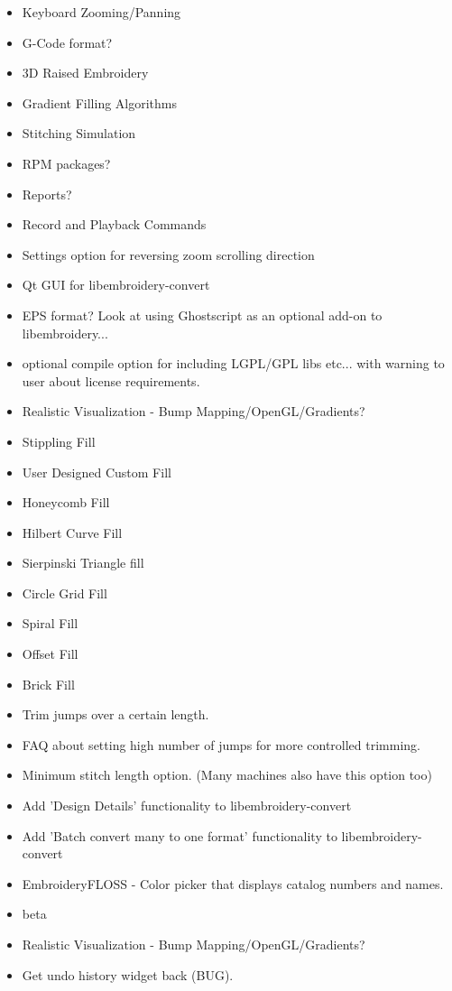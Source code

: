 \documentclass[11pt]{report}
\begin{document}
\begin{itemize}
  \item Keyboard Zooming/Panning
  \item G-Code format?
  \item 3D Raised Embroidery
  \item Gradient Filling Algorithms
  \item Stitching Simulation
  \item RPM packages?
  \item Reports?
  \item Record and Playback Commands
  \item Settings option for reversing zoom scrolling direction
  \item Qt GUI for libembroidery-convert
  \item EPS format? Look at using Ghostscript as an optional add-on to libembroidery...
  \item optional compile option for including LGPL/GPL libs etc... with warning to user about license requirements.
  \item Realistic Visualization - Bump Mapping/OpenGL/Gradients?
  \item Stippling Fill
  \item User Designed Custom Fill
  \item Honeycomb Fill
  \item Hilbert Curve Fill
  \item Sierpinski Triangle fill
  \item Circle Grid Fill
  \item Spiral Fill
  \item Offset Fill
  \item Brick Fill
  \item Trim jumps over a certain length.
  \item FAQ about setting high number of jumps for more controlled trimming.
  \item Minimum stitch length option. (Many machines also have this option too)
  \item Add 'Design Details' functionality to libembroidery-convert
  \item Add 'Batch convert many to one format' functionality to libembroidery-convert
  \item EmbroideryFLOSS - Color picker that displays catalog numbers and names.
\item beta
  \item Realistic Visualization - Bump Mapping/OpenGL/Gradients?
  \item Get undo history widget back (BUG).

\end{itemize}
\end{document}
